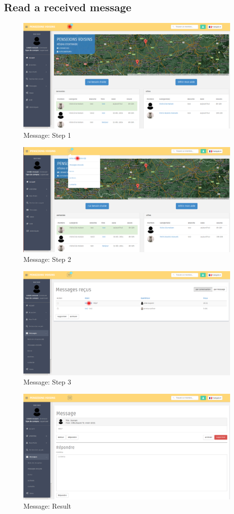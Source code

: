 \documentclass{article}
\begin{document}
\subsection{Read a received message}
\begin{figure}[!ht]
   \includegraphics[width=\textwidth]{img/mess1.png}
   \caption{Message: Step 1}
\end{figure}
\begin{figure}[!ht]
   \includegraphics[width=\textwidth]{img/mess2.png}
   \caption{Message: Step 2}
\end{figure}
\begin{figure}[!ht]
   \includegraphics[width=\textwidth]{img/mess3.png}
   \caption{Message: Step 3}
\end{figure}
\begin{figure}[!ht]
   \includegraphics[width=\textwidth]{img/mess4.png}
   \caption{Message: Result}
\end{figure}
\end{document}
